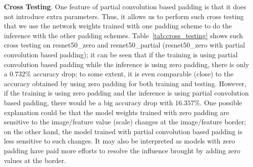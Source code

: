 \documentclass[10pt,twocolumn,letterpaper]{article}
\begin{document}
\begin{table*}[h]
\end{table*}\textbf{Cross Testing}. One feature of partial convolution based padding is that it does not introduce extra parameters. Thus, it allows us to perform such cross testing that we use the network weights trained with one padding scheme to do the inference with the other padding schemes. Table~\ref{tab:cross_testing} shows such cross testing on resnet50\_zero and resnet50\_partial (resnet50\_zero with partial convolution based padding); it can be seen that if the training is using partial convolution based padding while the inference is using zero padding, there is only a $0.732\%$ accuracy drop; to some extent, it is even comparable (close) to the  accuracy obtained by using zero padding for both training and testing. However, if the training is using zero padding and the inference is using partial convolution based padding, there would be a big accuracy drop with $16.357\%$. One possible explanation could be that the model weights trained with zero padding are sensitive to the image/feature value (scale) changes at the image/feature border; on the other hand, the model trained with partial convolution based padding is less sensitive to such changes. It may also be interpreted as models with zero padding have paid more efforts to resolve the influence brought by adding zero values at the border. 
\end{document}
